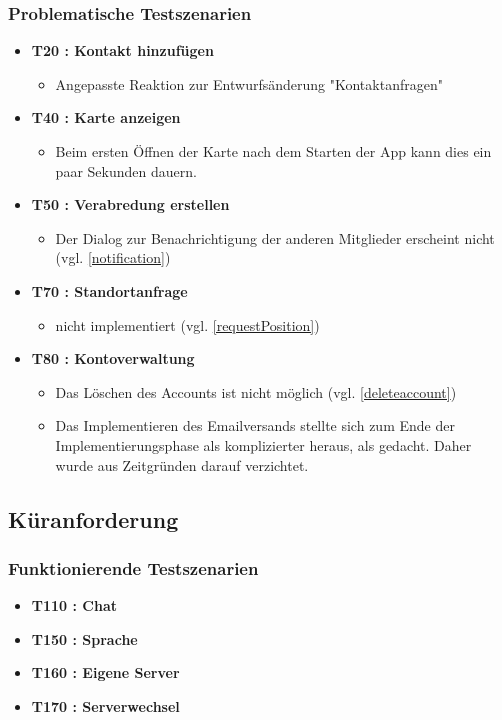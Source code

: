 \documentclass[parskip=full,11pt]{scrartcl}
\begin{document}
		\subsubsection{Problematische Testszenarien}
			\begin{itemize}
				\item \textbf{T20 : Kontakt hinzufügen}
					\begin{itemize}
						\item Angepasste Reaktion zur Entwurfsänderung "Kontaktanfragen"
					\end{itemize}
				\item \textbf{T40 : Karte anzeigen}
					\begin{itemize}
						\item Beim ersten Öffnen der Karte nach dem Starten der App kann
									dies ein paar Sekunden dauern.
						\end{itemize}
				\item \textbf{T50 : Verabredung erstellen}
					\begin{itemize}
						\item Der Dialog zur Benachrichtigung der anderen
                  Mitglieder erscheint nicht (vgl. \ref{notification})
					\end{itemize}
				\item \textbf{T70 : Standortanfrage}
					\begin{itemize}
						\item nicht implementiert (vgl. \ref{requestPosition})
					\end{itemize}
				\item \textbf{T80 : Kontoverwaltung}
					\begin{itemize}
            \item Das Löschen des Accounts ist nicht möglich
									(vgl. \ref{deleteaccount})
          	\item Das Implementieren des Emailversands stellte sich
                  zum Ende der Implementierungsphase als
                  komplizierter heraus, als gedacht. Daher wurde aus
                  Zeitgründen darauf verzichtet.
					\end{itemize}
				\end{itemize}

	\subsection{Küranforderung}
		\subsubsection{Funktionierende Testszenarien}
			\begin{itemize}
				\item \textbf{T110 : Chat} %
				\item \textbf{T150 : Sprache}
				\item \textbf{T160 : Eigene Server}
				\item \textbf{T170 : Serverwechsel}
	    \end{itemize}
\end{document}
